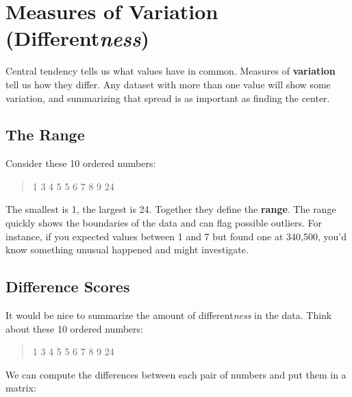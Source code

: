 \documentclass[
  letterpaper,
  DIV=11,
  numbers=noendperiod]{scrreprt}
\begin{document}
\section{\texorpdfstring{Measures of Variation
(Different\emph{ness})}{Measures of Variation (Differentness)}}\label{measures-of-variation-differentness}

Central tendency tells us what values have in common. Measures of
\textbf{variation} tell us how they differ. Any dataset with more than
one value will show some variation, and summarizing that spread is as
important as finding the center.

\subsection{The Range}\label{the-range}

Consider these 10 ordered numbers:

\begin{quote}
1 3 4 5 5 6 7 8 9 24
\end{quote}

The smallest is 1, the largest is 24. Together they define the
\textbf{range}. The range quickly shows the boundaries of the data and
can flag possible outliers. For instance, if you expected values between
1 and 7 but found one at 340,500, you'd know something unusual happened
and might investigate.

\subsection{Difference Scores}\label{difference-scores}

It would be nice to summarize the amount of different\emph{ness} in the
data. Think about these 10 ordered numbers:

\begin{quote}
1 3 4 5 5 6 7 8 9 24
\end{quote}

We can compute the differences between each pair of numbers and put them
in a matrix:
\end{document}
